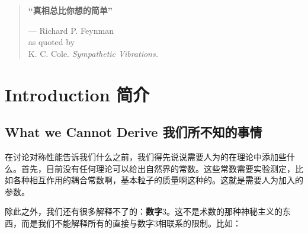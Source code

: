 

\begin{quote}%
{\bf “真相总比你想的简单”}


\begin{flushright}
--- Richard P. Feynman\\
as quoted by\\
K. C. Cole. {\it Sympathetic Vibrations.}
\end{flushright}
\end{quote}




\chapter[简介]{Introduction 简介}\label{chap1}

\section[我们所不知的事情]{What we Cannot Derive 我们所不知的事情}\label{sec1.1}

在讨论对称性能告诉我们什么之前，我们得先说说需要人为的在理论中添加些什么。首先，目前没有任何理论可以给出自然界的常数。这些常数需要实验测定，比如各种相互作用的耦合常数啊，基本粒子的质量啊这种的。这就是需要人为加入的参数。

除此之外，我们还有很多解释不了的：{\bf 数字$3$}。这不是术数的那种神秘主义的东西，而是我们不能解释所有的直接与数字$3$相联系的限制。比如：

